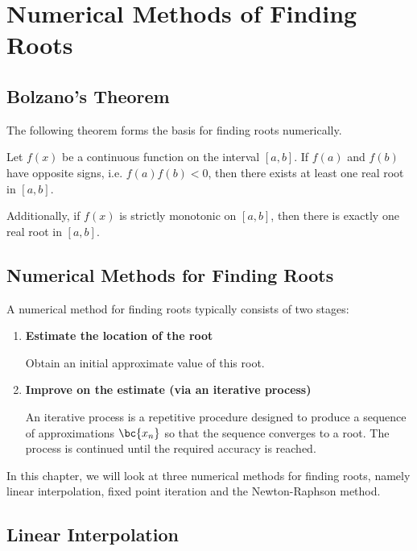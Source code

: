 \chapter{Numerical Methods of Finding Roots}

\section{Bolzano's Theorem}

The following theorem forms the basis for finding roots numerically.

\begin{theorem}
    Let $f(x)$ be a continuous function on the interval $[a, b]$. If $f(a)$ and $f(b)$ have opposite signs, i.e. $f(a) f(b) < 0$, then there exists at least one real root in $[a, b]$.
\end{theorem}

Additionally, if $f(x)$ is strictly monotonic on $[a, b]$, then there is exactly one real root in $[a, b]$.

\section{Numerical Methods for Finding Roots}

A numerical method for finding roots typically consists of two stages:
\renewcommand{\theenumi}{\arabic{enumi}.}%
\begin{enumerate}
    \item \textbf{Estimate the location of the root}
    
    Obtain an initial approximate value of this root.
    \item \textbf{Improve on the estimate (via an iterative process)}

    An iterative process is a repetitive procedure designed to produce a sequence of approximations $\bc{x_n}$ so that the sequence converges to a root. The process is continued until the required accuracy is reached.
\end{enumerate}
\renewcommand{\theenumi}{(\alph{enumi})}

In this chapter, we will look at three numerical methods for finding roots, namely linear interpolation, fixed point iteration and the Newton-Raphson method.

\section{Linear Interpolation}

